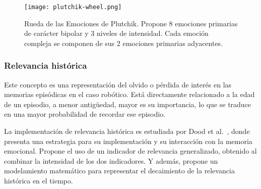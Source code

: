 \begin{figure}[!ht]
	\centering
	\texttt{[image: plutchik-wheel.png]}
	\caption{\small Rueda de las Emociones de Plutchik. Propone 8 emociones primarias de carácter bipolar y 3 niveles de intensidad. Cada emoción compleja se componen de sus 2 emociones primarias adyacentes.}
	\label{img:plutchik}
\end{figure}


\subsubsection{Relevancia histórica}
Este concepto es una representación del olvido o pérdida de interés en las memorias episódicas en el caso robótico. Está directamente relacionado a la edad de un episodio, a menor antigüedad, mayor es su importancia, lo que se traduce en una mayor probabilidad de recordar ese episodio.

La implementación de relevancia histórica es estudiada por Dood et al.~\cite{Dodd2005}, donde presenta una estrategia para su implementación y su interacción con la memoria emocional. Propone el uso de un indicador de relevancia generalizado, obtenido al combinar la intensidad de los dos indicadores. Y además, propone un modelamiento matemático para representar el decaimiento de la relevancia histórica en el tiempo.

